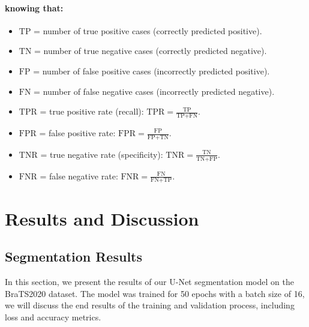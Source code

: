 \begin{itemize}
        \paragraph{knowing that:}
        \begin{itemize}
          \item \(\text{TP}\) = number of true positive cases (correctly predicted positive).
          \item \(\text{TN}\) = number of true negative cases (correctly predicted negative).
          \item \(\text{FP}\) = number of false positive cases (incorrectly predicted positive).
          \item \(\text{FN}\) = number of false negative cases (incorrectly predicted negative).
          \item \(\text{TPR}\) = true positive rate (recall): \(\text{TPR} = \frac{\text{TP}}{\text{TP} + \text{FN}}\).
          \item \(\text{FPR}\) = false positive rate: \(\text{FPR} = \frac{\text{FP}}{\text{FP} + \text{TN}}\).
          \item \(\text{TNR}\) = true negative rate (specificity): \(\text{TNR} = \frac{\text{TN}}{\text{TN} + \text{FP}}\).
          \item \(\text{FNR}\) = false negative rate: \(\text{FNR} = \frac{\text{FN}}{\text{FN} + \text{TP}}\).
        \end{itemize}

\end{itemize}




\section{Results and Discussion}




\subsection{Segmentation Results}
\label{sec:segmentation-results}
In this section, we present the results of our U-Net segmentation model on the BraTS2020 dataset. The model was trained for 50 epochs with a batch size of 16, we will discuss the end results of the training and validation process, including loss and accuracy metrics.

